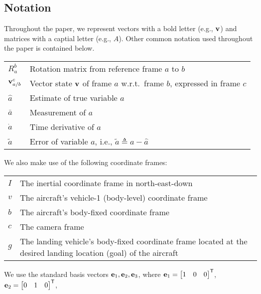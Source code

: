 
\subsection{Notation}

Throughout the paper, we represent vectors with a bold letter (e.g., $\bf v$)
and matrices with a captial letter (e.g., $A$). Other common notation used
throughout the paper is contained below.
\begin{center}
\begin{tabularx}{\columnwidth}{lX}
$R_a^b$ & Rotation matrix from reference frame $a$ to $b$ \\
$\boldsymbol{\mathrm{v}}_{a/b}^c$ & Vector state $\boldsymbol{\mathrm{v}}$ of frame $a$ w.r.t.~frame $b$, expressed in frame $c$ \\
$\hat{a}$ & Estimate of true variable $a$ \\
$\bar{a}$ & Measurement of $a$ \\
$\dot{a}$ & Time derivative of $a$ \\
$\tilde{a}$ & Error of variable $a$, i.e., $\tilde{a} \triangleq a - \hat{a}$
\end{tabularx}
\end{center}
%
We also make use of the following coordinate frames:
\begin{center}
\begin{tabularx}{\columnwidth}{lX}
$I$ & The inertial coordinate frame in north-east-down\\
$v$ & The aircraft's vehicle-1 (body-level) coordinate frame \\
$b$ & The aircraft's body-fixed coordinate frame \\
$c$ & The camera frame \\
$g$ & The landing vehicle's body-fixed coordinate frame located at the desired
landing location (goal) of the aircraft
\end{tabularx}
\end{center}
%
We use the standard basis vectors $\boldsymbol{\mathrm{e}}_1, \boldsymbol{\mathrm{e}}_2, \boldsymbol{\mathrm{e}}_3$,
where $\boldsymbol{\mathrm{e}}_1 = \begin{bmatrix} 1 & 0 & 0 \end{bmatrix}^{\mathsf{T}}$,
$\boldsymbol{\mathrm{e}}_2 = \begin{bmatrix} 0 & 1 & 0 \end{bmatrix}^{\mathsf{T}}$,
